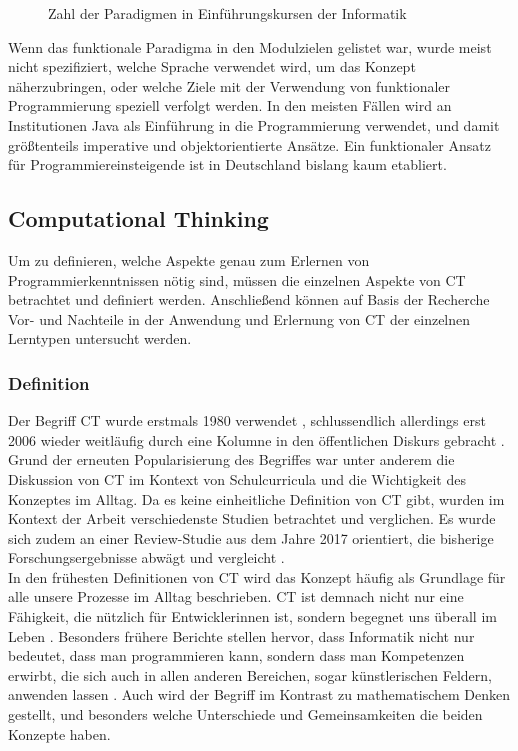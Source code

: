 \begin{figure}[H]
    \centering
    
    \caption{Zahl der Paradigmen in Einführungskursen der Informatik}
\end{figure}

Wenn das funktionale Paradigma in den Modulzielen gelistet war, wurde meist nicht spezifiziert, welche Sprache verwendet wird, um das Konzept näherzubringen, oder welche Ziele mit der Verwendung von funktionaler Programmierung speziell verfolgt werden.
In den meisten Fällen wird an Institutionen Java als Einführung in die Programmierung verwendet, und damit größtenteils imperative und objektorientierte Ansätze.
Ein funktionaler Ansatz für Programmiereinsteigende ist in Deutschland bislang kaum etabliert.

\subsection{Computational Thinking}
Um zu definieren, welche Aspekte genau zum Erlernen von Programmierkenntnissen nötig sind, müssen die einzelnen Aspekte von CT betrachtet und definiert werden. Anschließend können auf Basis der Recherche Vor- und Nachteile in der Anwendung und Erlernung von CT der einzelnen Lerntypen untersucht werden.

\subsubsection{Definition}
Der Begriff CT wurde erstmals 1980 verwendet \cite{papert}, schlussendlich allerdings erst 2006 wieder weitläufig durch eine Kolumne in den öffentlichen Diskurs gebracht \cite{wing2006}.
Grund der erneuten Popularisierung des Begriffes war unter anderem die Diskussion von CT im Kontext von Schulcurricula und die Wichtigkeit des Konzeptes im Alltag.
Da es keine einheitliche Definition von CT gibt, wurden im Kontext der Arbeit verschiedenste Studien betrachtet und verglichen. Es wurde sich zudem an einer Review-Studie aus dem Jahre 2017 orientiert, die bisherige Forschungsergebnisse abwägt und vergleicht \cite{schute}.
\\
In den frühesten Definitionen von CT wird das Konzept häufig als Grundlage für alle unsere Prozesse im Alltag beschrieben. CT ist demnach nicht nur eine Fähigkeit, die nützlich für Entwicklerinnen ist, sondern begegnet uns überall im Leben \cite{khine17}. Besonders frühere Berichte stellen hervor, dass Informatik nicht nur bedeutet, dass man programmieren kann, sondern dass man Kompetenzen erwirbt, die sich auch in allen anderen Bereichen, sogar künstlerischen Feldern, anwenden lassen \cite{wing2006}.
Auch wird der Begriff im Kontrast zu mathematischem Denken gestellt, und besonders welche Unterschiede und Gemeinsamkeiten die beiden Konzepte haben.

